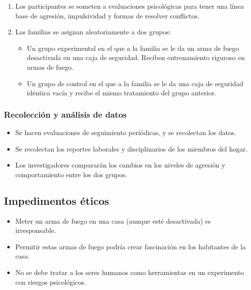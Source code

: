 \documentclass[12pt]{article}
\begin{document}
\begin{enumerate}
\item Los participantes se someten a evaluaciones psicológicas para tener una línea base de agresión, impulsividad y formas de resolver conflictos. 

\item Las familias se asignan aleatoriamente a dos grupos: 
\begin{itemize}

\item Un grupo experimental en el que a la familia se le da un arma de fuego desactivada en una caja de seguridad. Reciben entrenamiento riguroso en armas de fuego. 

\item Un grupo de control en el que a la familia se le da una caja de seguridad idéntica vacía y recibe el mismo tratamiento del grupo anterior. 

\end{itemize}

\end{enumerate}

\subsubsection{Recolección y análisis de datos} 


\begin{itemize}
\item Se hacen evaluaciones de seguimiento periódicas, y se recolectan los datos. 

\item Se recolectan los reportes laborales y disciplinarios de los miembros del hogar. 

\item Los investigadores compararán los cambios en los niveles de agresión y comportamiento entre los dos grupos. 


\end{itemize}


\subsection{Impedimentos éticos}
\begin{itemize}
\item Meter un arma de fuego en una casa (aunque esté desactivada) es irresponsable. 

\item Permitir estas armas de fuego podría crear fascinación en los habitantes de la casa. 

\item No se debe tratar a los seres humanos como herramientas en un experimento con riesgos psicológicos.

\end{itemize}
\end{document}
